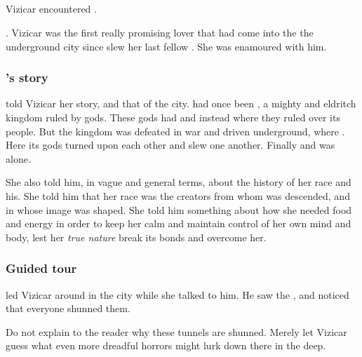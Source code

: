 \subsection{\Lethiarch}
Vizicar encountered . 

. 
Vizicar was the first really promising lover that had come into the the underground city since \Lethiarch slew her last fellow \resphan.
She was enamoured with him.





\subsubsection{\Lethiarch's story}
\Lethiarch told Vizicar her story, and that of the city.
 had once been , a mighty and eldritch kingdom ruled by \resphan gods. 
These gods had  and instead  where they ruled over its people.
But the kingdom was defeated in war and driven underground, where . 
Here its gods turned upon each other and slew one another.
Finally \Lethiarch {} and was alone. 

She also told him, in vague and general terms, about the history of her race and his.
She told him that her race was the creators from whom \humanity was descended, and in whose image \humanity was shaped. 
She told him something about how she needed food and energy in order to keep her calm and maintain control of her own mind and body, lest her \emph{true nature} break its bonds and overcome her. 





\subsubsection{Guided tour}
\Lethiarch led Vizicar around in the city while she talked to him.
He saw the , and noticed that everyone shunned them.

Do not explain to the reader why these tunnels are shunned.
Merely let Vizicar guess what even more dreadful horrors might lurk down there in the deep.





